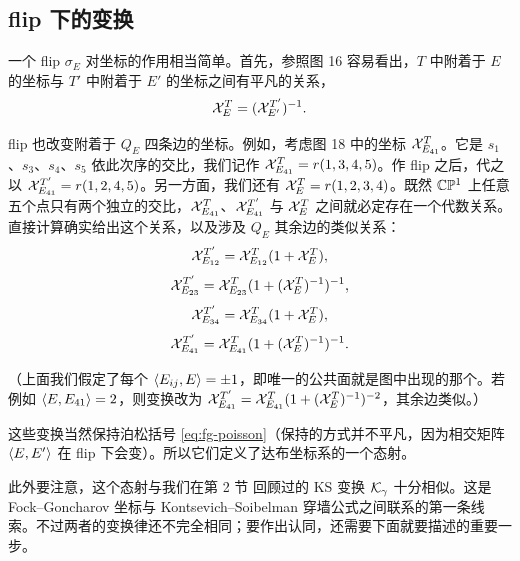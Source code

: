\subsection{flip 下的变换}
\label{subsec:TransfmFlips}

一个 flip $\sigma_E$ 对坐标的作用相当简单。首先，参照图 16%
容易看出，$T$ 中附着于 $E$ 的坐标与 $T'$ 中附着于 $E'$ 的坐标之间有平凡的关系，
\begin{equation}\label{eq:fg-trans-1}
\mathcal{X}^T_E = (\mathcal{X}^{T'}_{E'})^{-1}.
\end{equation}


flip 也改变附着于 $Q_E$ 四条边的坐标。例如，考虑图 18%
中的坐标 $\mathcal{X}^T_{E_{41}}$。它是 $s_1$、$s_3$、$s_4$、$s_5$ 依此次序的交比，我们记作 $\mathcal{X}^T_{E_{41}}=r(1,3,4,5)$。作 flip 之后，代之以 $\mathcal{X}^{T'}_{E_{41}}=r(1,2,4,5)$。另一方面，我们还有 $\mathcal{X}^T_E=r(1,2,3,4)$。既然 $\mathbb{C}\mathbb{P}^1$ 上任意五个点只有两个独立的交比，$\mathcal{X}^T_{E_{41}}$、$\mathcal{X}^{T'}_{E_{41}}$ 与 $\mathcal{X}^T_E$ 之间就必定存在一个代数关系。直接计算确实给出这个关系，以及涉及 $Q_E$ 其余边的类似关系：
\begin{equation}\label{eq:fg-trans-2}
\mathcal{X}^{T'}_{E_{12}} = \mathcal{X}^T_{E_{12}}(1+\mathcal{X}^T_E),
\end{equation}
\begin{equation}\label{eq:fg-trans-3}
\mathcal{X}^{T'}_{E_{23}} = \mathcal{X}^T_{E_{23}}(1+(\mathcal{X}^T_E)^{-1})^{-1},
\end{equation}
\begin{equation}\label{eq:fg-trans-4}
\mathcal{X}^{T'}_{E_{34}} = \mathcal{X}^T_{E_{34}}(1+\mathcal{X}^T_E),
\end{equation}
\begin{equation}\label{eq:fg-trans-5}
\mathcal{X}^{T'}_{E_{41}} = \mathcal{X}^T_{E_{41}}(1+(\mathcal{X}^T_E)^{-1})^{-1}.
\end{equation}

（上面我们假定了每个 $\langle E_{ij},E \rangle=\pm1$，即唯一的公共面就是图中出现的那个。若例如 $\langle E,E_{41} \rangle=2$，则变换改为 $\mathcal{X}^{T'}_{E_{41}}=\mathcal{X}^T_{E_{41}}(1+(\mathcal{X}^T_E)^{-1})^{-2}$，其余边类似。）

这些变换当然保持泊松括号 \eqref{eq:fg-poisson}（保持的方式并不平凡，因为相交矩阵 $\langle E,E' \rangle$ 在 flip 下会变）。所以它们定义了达布坐标系的一个态射。

此外要注意，这个态射与我们在第 2 节%
回顾过的 KS 变换 $\mathcal{K}_\gamma$ 十分相似。这是 Fock--Goncharov 坐标与 Kontsevich--Soibelman 穿墙公式之间联系的第一条线索。不过两者的变换律还不完全相同；要作出认同，还需要下面就要描述的重要一步。

